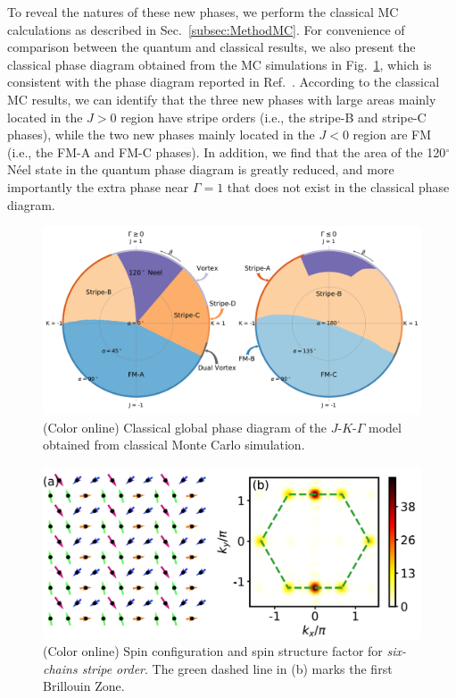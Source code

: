 \documentclass[aps,prb,reprint,amsfonts,amsmath,amssymb,showpacs,groupedaddress,superscriptaddress]{revtex4-1}
\begin{document}
To reveal the natures of these new phases, we perform the classical MC calculations as described in Sec.~\ref{subsec:MethodMC}. For convenience of comparison between the quantum and classical results, we also present the classical phase diagram obtained from the MC simulations in Fig.~\ref{fig:ClassicalPhaseDiagram}, which is consistent with the phase diagram reported in Ref.~. According to the classical MC results, we can identify that the three new phases with large areas mainly located in the $J>0$ region have stripe orders (i.e., the stripe-B and stripe-C phases), while the two new phases mainly located in the $J<0$ region are FM (i.e., the FM-A and FM-C phases). In addition, we find that the area of the 120$^\circ$ N\'{e}el state in the quantum phase diagram is greatly reduced, and more importantly the extra phase near $\Gamma=1$ that does not exist in the classical phase diagram.
\begin{figure}
    \centering
    \includegraphics[width=\columnwidth]{fig/ClassicalGlobalPhaseDiagram.pdf}
    \caption{\label{fig:ClassicalPhaseDiagram}(Color online) Classical global phase diagram of the $J$-$K$-$\Gamma$ model obtained from classical Monte Carlo simulation.}
\end{figure}

\begin{figure}
    \centering
    \includegraphics[width=\columnwidth]{fig/SixSitesOrder.pdf}
    \caption{\label{fig:SixSitesOrder}(Color online) Spin configuration and spin structure factor for \emph{six-chains stripe order}. The green dashed line in (b) marks the first Brillouin Zone.}
\end{figure}
\end{document}
